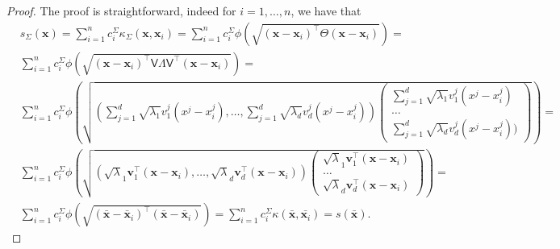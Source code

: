 \documentclass[10pt,a4paper]{amsart}
\newcommand{\mLambda}{\mathsf{\Lambda}}
\newcommand{\mSigma}{\mathsf{\Sigma}}
\newcommand{\mTheta}{\mathsf{\Theta}}
\newcommand{\mV}{\mathsf{V}}
\begin{document}
\begin{proof}
The proof is straightforward, indeed for $i=1,\ldots,n$, we have that 
\begin{align*}
   & s_{\mSigma}(\boldsymbol{x}) = \sum_{i=1}^n  c_i^{\mSigma} \kappa_{\mSigma}(\boldsymbol{x},\boldsymbol{x}_i) = \sum_{i=1}^n  c_i^{\mSigma} \phi(\sqrt{(\boldsymbol{x}-\boldsymbol{x}_i)^{\intercal} \mTheta (\boldsymbol{x}-\boldsymbol{x}_i)}) = \\
   & \sum_{i=1}^n  c_i^{\mSigma} \phi(\sqrt{(\boldsymbol{x}-\boldsymbol{x}_i)^{\intercal} \mV \mLambda \mV^{\intercal} (\boldsymbol{x}-\boldsymbol{x}_i)}) = \\
    & \sum_{i=1}^n  c_i^{\mSigma} \phi\left(\sqrt{\left( \sum_{j=1}^d \sqrt{\lambda_1}v_1^j({{x}}^j-{{x}}_{i}^j), \ldots, \sum_{j=1}^d \sqrt{\lambda_d}v_d^j({{x}}^j-{{x}}_{i}^j)\right)\begin{pmatrix}
         \sum_{j=1}^d \sqrt{\lambda_1}v_1^j({{x}}^j-{{x}}_{i}^j) \\ 
         \ldots \\
         \sum_{j=1}^d \sqrt{\lambda_d}v_d^j({{x}}^j-{{x}}_{i}^j))
    \end{pmatrix} } \right) = \\
    &\sum_{i=1}^n  c_i^{\mSigma} \phi\left(\sqrt{\left( \sqrt{\lambda}_1{\boldsymbol{v}}_1^{\intercal} {(\boldsymbol{x}-\boldsymbol{x}_i)}, \ldots, \sqrt{\lambda}_d{\boldsymbol{v}}_d^{\intercal} {(\boldsymbol{x}-\boldsymbol{x}_i)}\right ) \begin{pmatrix}
    \sqrt{\lambda}_1{\boldsymbol{v}}_1^{\intercal} {(\boldsymbol{x}-\boldsymbol{x}_i)} \\ 
    \ldots \\
    \sqrt{\lambda}_d{\boldsymbol{v}}_d^{\intercal} {(\boldsymbol{x}-\boldsymbol{x}_i)}
    \end{pmatrix}} \right) =\\
     & \sum_{i=1}^n  c_i^{\mSigma} \phi(\sqrt{(\bar{\boldsymbol{x}}-\bar{\boldsymbol{x}}_i)^{\intercal} (\bar{\boldsymbol{x}}-\bar{\boldsymbol{x}}_i)}) = \sum_{i=1}^n  c_i^{\mSigma} \kappa
    (\bar{\boldsymbol{x}},\bar{\boldsymbol{x}_i}) = s(\bar{\boldsymbol{x}}).
\end{align*}
\end{proof}
\end{document}
